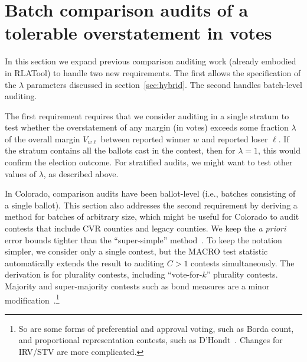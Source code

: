 \section{Batch comparison audits of a tolerable overstatement in votes}
\label{sec:comparisonError}

In this section we expand previous comparison auditing work (already embodied in RLATool) to handle two new requirements.  The first allows the specification of the $\lambda$ parameters discussed in section~\ref{sec:hybrid}. The second handles batch-level auditing.

The first requirement requires that we consider auditing in a single stratum to test whether the overstatement of any margin
(in votes) exceeds some fraction $\lambda$ of the overall margin $V_{w\ell}$ between
reported winner $w$ and reported loser $\ell$.
If the stratum contains all the ballots cast in the contest, then for $\lambda = 1$, this 
would confirm the election outcome.
For stratified audits, we might want to test other values of $\lambda$, as described above.

In Colorado, comparison audits have been ballot-level (i.e., batches consisting of a single
ballot). 
This section also addresses the second requirement by deriving a method for batches of arbitrary size, which might be useful
for Colorado to audit contests that include CVR counties and legacy counties.
We keep the \emph{a priori} error bounds tighter than the ``super-simple'' 
method~\citep{stark10d}.
To keep the notation simpler, we consider only a single contest, but the 
MACRO test statistic \citep{stark09c,stark10d} automatically extends the result to 
auditing $C>1$ contests simultaneously.
The derivation is for plurality contests, including ``vote-for-$k$'' plurality contests.
Majority and super-majority contests such as bond measures are a minor 
modification~\citep{stark08a}.\footnote{%
  So are some forms of preferential and approval voting, such as Borda count, and
  proportional representation contests, such as D'Hondt~\citep{starkTeague14}.
  Changes for IRV/STV are more complicated.
}

